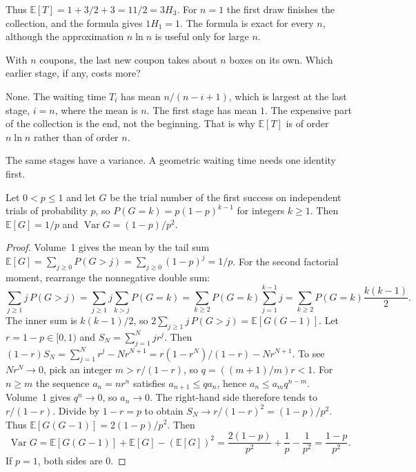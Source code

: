 Thus $\mathbb E[T]=1+3/2+3=11/2=3H_3$. For $n=1$ the first draw finishes the collection, and the formula gives $1H_1=1$. The formula is exact for every $n$, although the approximation $n\ln n$ is useful only for large $n$.

\begin{think}
With $n$ coupons, the last new coupon takes about $n$ boxes on its own. Which earlier stage, if any, costs more?
\end{think}

None. The waiting time $T_i$ has mean $n/(n-i+1)$, which is largest at the last stage, $i=n$, where the mean is $n$. The first stage has mean $1$. The expensive part of the collection is the end, not the beginning. That is why $\mathbb E[T]$ is of order $n\ln n$ rather than of order $n$.

The same stages have a variance. A geometric waiting time needs one identity first.

\begin{lemma}\label{lem:geovar}
Let $0<p\le1$ and let $G$ be the trial number of the first success on independent trials of probability $p$, so $P(G=k)=p(1-p)^{k-1}$ for integers $k\ge1$. Then $\mathbb E[G]=1/p$ and $\operatorname{Var}G=(1-p)/p^2$.
\end{lemma}
\begin{proof}
Volume~1 gives the mean by the tail sum $\mathbb E[G]=\sum_{j\ge0}P(G>j)=\sum_{j\ge0}(1-p)^j=1/p$. For the second factorial moment, rearrange the nonnegative double sum:
\[
 \sum_{j\ge1}j\,P(G>j)=\sum_{j\ge1}j\sum_{k>j}P(G=k)=\sum_{k\ge2}P(G=k)\sum_{j=1}^{k-1}j=\sum_{k\ge2}P(G=k)\frac{k(k-1)}{2}.
\]
The inner sum is $k(k-1)/2$, so $2\sum_{j\ge1}j\,P(G>j)=\mathbb E[G(G-1)]$. Let $r=1-p\in[0,1)$ and $S_N=\sum_{j=1}^N jr^j$. Then $(1-r)S_N=\sum_{j=1}^N r^j-Nr^{N+1}=r(1-r^N)/(1-r)-Nr^{N+1}$. To see $Nr^N\to0$, pick an integer $m>r/(1-r)$, so $q=((m+1)/m)r<1$. For $n\ge m$ the sequence $a_n=nr^n$ satisfies $a_{n+1}\le q a_n$, hence $a_n\le a_m q^{n-m}$. Volume~1 gives $q^{n}\to0$, so $a_n\to0$. The right-hand side therefore tends to $r/(1-r)$. Divide by $1-r=p$ to obtain $S_N\to r/(1-r)^2=(1-p)/p^2$. Thus $\mathbb E[G(G-1)]=2(1-p)/p^2$. Then
\[
 \operatorname{Var}G=\mathbb E[G(G-1)]+\mathbb E[G]-(\mathbb E[G])^2=\frac{2(1-p)}{p^2}+\frac1p-\frac1{p^2}=\frac{1-p}{p^2}.
\]
If $p=1$, both sides are $0$.
\end{proof}

